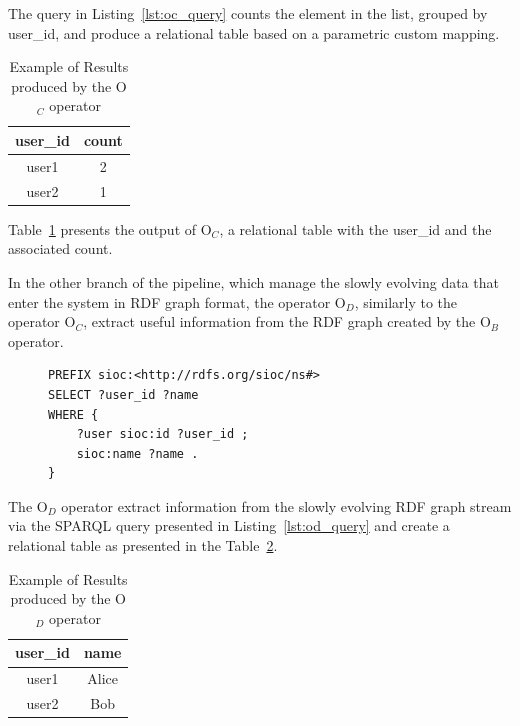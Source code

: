 {\medskip

The query in Listing~\ref{lst:oc_query} counts the element in the list, grouped by user\_id, and produce a relational table based on a parametric custom mapping. 

\begin{table}[ht]
\centering
\caption{Example of Results produced by the O$_C$ operator}
\label{tbl:oc_res}
    \begin{tabular}{|c|c|}
        \hline
        \textbf{user\_id} & \textbf{count} \\ \hline
        user1             & 2              \\ \hline
        user2             & 1              \\ \hline
    \end{tabular}
\end{table}

Table~\ref{tbl:oc_res} presents the output of O$_C$, a relational table with the user\_id and the associated count.

In the other branch of the pipeline, which manage the slowly evolving data that enter the system in RDF graph format, the operator O$_D$, similarly to the operator O$_C$, extract useful information from the RDF graph created by the O$_B$ operator. 

\begin{figure}[ht]
\begin{minipage}{0.95\linewidth}
\begin{lstlisting}[caption={SPAQL query applied by operator O$_D$ to the RDF stream to project information about the user.},label=lst:od_query,style=SPARQL]
PREFIX sioc:<http://rdfs.org/sioc/ns#>
SELECT ?user_id ?name
WHERE {
    ?user sioc:id ?user_id ;
    sioc:name ?name .
} 
\end{lstlisting}
\end{minipage}
\end{figure}

\medskip

The O$_D$ operator extract information from the slowly evolving RDF graph stream via the SPARQL query presented in Listing~\ref{lst:od_query} and create a relational table as presented in the Table~\ref{tbl:od_res}.

\begin{table}[ht]
\centering
\caption{Example of Results produced by the O$_D$ operator}
\label{tbl:od_res}
    \begin{tabular}{|c|c|}
        \hline
        \textbf{user\_id} & \textbf{name} \\ \hline
        user1             & Alice         \\ \hline
        user2             & Bob           \\ \hline
    \end{tabular}
\end{table}

}
